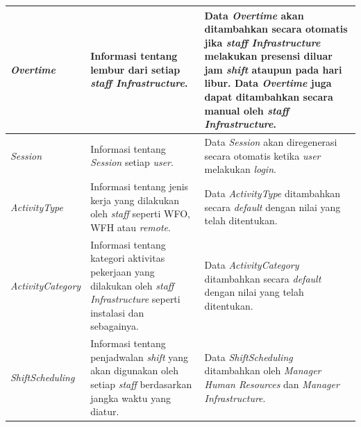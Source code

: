 \begin{longtable}{ |p{3cm}|p{6cm}|p{6cm}|}
\textit{Overtime}
&Informasi tentang lembur dari setiap \textit{staff Infrastructure}.
&Data \textit{Overtime} akan ditambahkan secara otomatis jika \textit{staff Infrastructure} melakukan presensi diluar jam \textit{shift} ataupun pada hari libur. Data \textit{Overtime} juga dapat ditambahkan secara manual oleh \textit{staff Infrastructure}.
\\ 
\hline

\textit{Session}
&Informasi tentang \textit{Session} setiap \textit{user}.
&Data \textit{Session} akan diregenerasi secara otomatis ketika \textit{user} melakukan \textit{login}.
\\
\hline

\textit{ActivityType}
&Informasi tentang jenis kerja yang dilakukan oleh \textit{staff} seperti WFO, WFH atau \textit{remote}.
&Data \textit{ActivityType} ditambahkan secara \textit{default} dengan nilai yang telah ditentukan.
\\
\hline

\textit{ActivityCategory}
&Informasi tentang kategori aktivitas pekerjaan yang dilakukan oleh \textit{staff Infrastructure} seperti instalasi dan sebagainya.
&Data \textit{ActivityCategory} ditambahkan secara \textit{default} dengan nilai yang telah ditentukan.
\\
\hline

\textit{ShiftScheduling}
&Informasi tentang penjadwalan \textit{shift} yang akan digunakan oleh setiap \textit{staff} berdasarkan jangka waktu yang diatur.
&Data \textit{ShiftScheduling} ditambahkan oleh \textit{Manager Human Resources} dan \textit{Manager Infrastructure}.
\\
\hline

\end{longtable}


